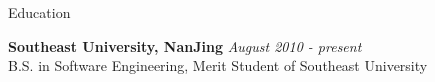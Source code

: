 \documentclass{resume} %
\begin{document}

\begin{rSection}{Education}

{\bf Southeast University, NanJing} \hfill {\em August 2010 - present} \\ 
B.S. in Software Engineering, Merit Student of Southeast University 
\end{rSection}

\end{document}

